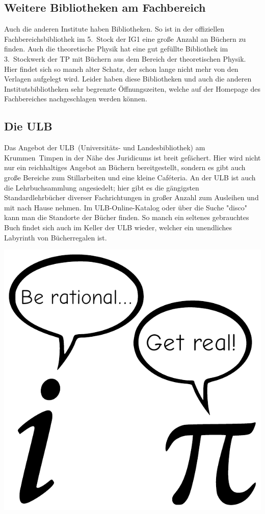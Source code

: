 \begin{multicols*}{2}
\subsection{Weitere Bibliotheken am Fachbereich}
Auch die anderen Institute haben Bibliotheken.
So ist in der offiziellen Fachbereichsbibliothek im 5.~Stock der IG1 eine große Anzahl an Büchern zu finden.
Auch die theoretische Physik hat eine gut gefüllte Bibliothek im 3.~Stockwerk der TP mit Büchern aus dem Bereich der theoretischen Physik.
Hier findet sich so manch alter Schatz, der schon lange nicht mehr von den Verlagen aufgelegt wird.
Leider haben diese Bibliotheken und auch die anderen Institutsbibliotheken sehr begrenzte Öffnungszeiten, welche auf der Homepage des Fachbereiches nachgeschlagen werden können.


\subsection{Die ULB}
Das Angebot der ULB~(Universitäts- und Landesbibliothek) am Krummen~Timpen in der Nähe des Juridicums ist breit gefächert.
Hier wird nicht nur ein reichhaltiges Angebot an Büchern bereitgestellt, sondern es gibt auch große Bereiche zum Stillarbeiten und eine kleine Caféteria.
An der ULB ist auch die Lehrbuchsammlung angesiedelt; hier gibt es die gängigsten Standardlehrbücher diverser Fachrichtungen in großer Anzahl zum Ausleihen und mit nach Hause nehmen.
Im ULB-Online-Katalog oder über die Suche "disco" kann man die Standorte der Bücher finden.
So manch ein seltenes gebrauchtes Buch findet sich auch im Keller der ULB wieder, welcher ein unendliches Labyrinth von Bücherregalen ist.

\begin{center}
	\includegraphics[width=\columnwidth, height=0.26\textheight]{res/comics/be_rational_get_real.pdf}
\end{center}

\end{multicols*}
